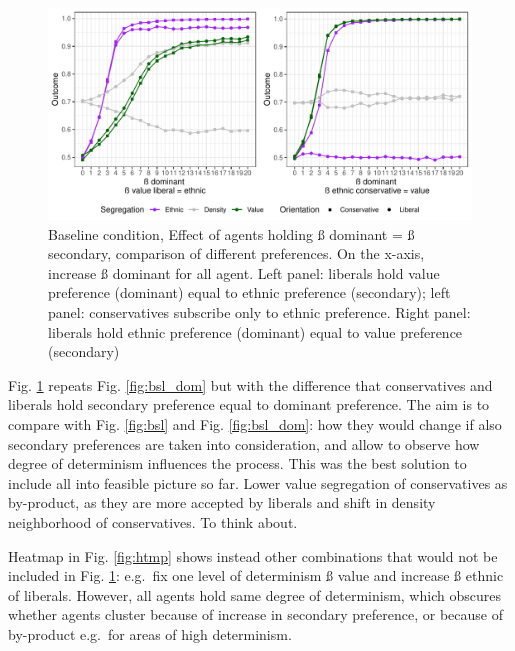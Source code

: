 \documentclass[
]{article}
\begin{document}
\begin{figure}[H]

{\centering \includegraphics[width=1\linewidth]{ev_rum_files/figure-latex/bsl_sec-1} 

}

\caption{Baseline condition, Effect of agents holding ß dominant = ß secondary, comparison of different preferences. On the x-axis, increase ß dominant for all agent. Left panel: liberals hold value preference (dominant) equal to ethnic preference (secondary); left panel: conservatives subscribe only to ethnic preference. Right panel: liberals hold ethnic preference (dominant) equal to value preference (secondary)}\label{fig:bsl_sec}
\end{figure}

Fig. \ref{fig:bsl_sec} repeats Fig. \ref{fig:bsl_dom} but with the
difference that conservatives and liberals hold secondary preference
equal to dominant preference. The aim is to compare with Fig.
\ref{fig:bsl} and Fig. \ref{fig:bsl_dom}: how they would change if also
secondary preferences are taken into consideration, and allow to observe
how degree of determinism influences the process. This was the best
solution to include all into feasible picture so far. Lower value
segregation of conservatives as by-product, as they are more accepted by
liberals and shift in density neighborhood of conservatives. To think
about.

Heatmap in Fig. \ref{fig:htmp} shows instead other combinations that
would not be included in Fig. \ref{fig:bsl_sec}: e.g.~fix one level of
determinism ß value and increase ß ethnic of liberals. However, all
agents hold same degree of determinism, which obscures whether agents
cluster because of increase in secondary preference, or because of
by-product e.g.~for areas of high determinism.
\end{document}

